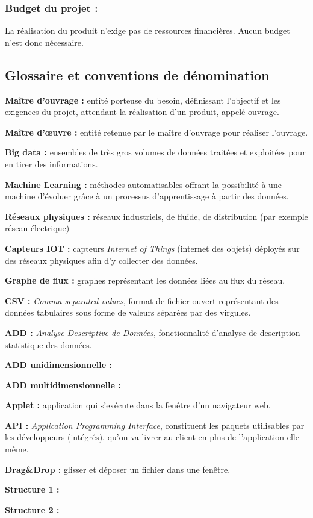 			\subsubsection{Budget du projet :}
				La réalisation du produit n'exige pas de ressources financières. Aucun budget n'est donc nécessaire.
		
		\subsection{Glossaire et conventions de dénomination}
			\begin{description}[style=unboxed,leftmargin=0.2cm]
				\item\textbf{Maître d'ouvrage :} entité porteuse du besoin, définissant l'objectif et les exigences du projet, attendant la réalisation d'un produit, appelé ouvrage.
				\item\textbf{Maître d'œuvre :} entité retenue par le maître d'ouvrage pour réaliser l'ouvrage.
				\item\textbf{Big data :} ensembles de très gros volumes de données traitées et exploitées pour en tirer des informations.
				\item\textbf{Machine Learning :} méthodes automatisables offrant la possibilité à une machine d'évoluer grâce à un processus d'apprentissage à partir des données.
				\item\textbf{Réseaux physiques :} réseaux industriels, de fluide, de distribution (par exemple réseau électrique)
				\item\textbf{Capteurs IOT :} capteurs \textit{Internet of Things} (internet des objets) déployés sur des réseaux physiques afin d'y collecter des données.
				\item\textbf{Graphe de flux :} graphes représentant les données liées au flux du réseau.
				\item\textbf{CSV :} \textit{Comma-separated values}, format de fichier ouvert représentant des données tabulaires sous forme de valeurs séparées par des virgules.
				\item\textbf{ADD :} \textit{Analyse Descriptive de Données}, fonctionnalité d'analyse de description statistique des données.
				\item\textbf{ADD unidimensionnelle :}
				\item\textbf{ADD multidimensionnelle :}
				\item\textbf{Applet :} application qui s'exécute dans la fenêtre d'un navigateur web.
				\item\textbf{API :} \textit{Application Programming Interface}, constituent les paquets utilisables par les développeurs (intégrés), qu'on va livrer au client en plus de l'application elle-même.
				\item\textbf{Drag\&Drop :} glisser et déposer un fichier dans une fenêtre.
				\item\textbf{Structure 1 :}
				\item\textbf{Structure 2 :}
			\end{description}
			
